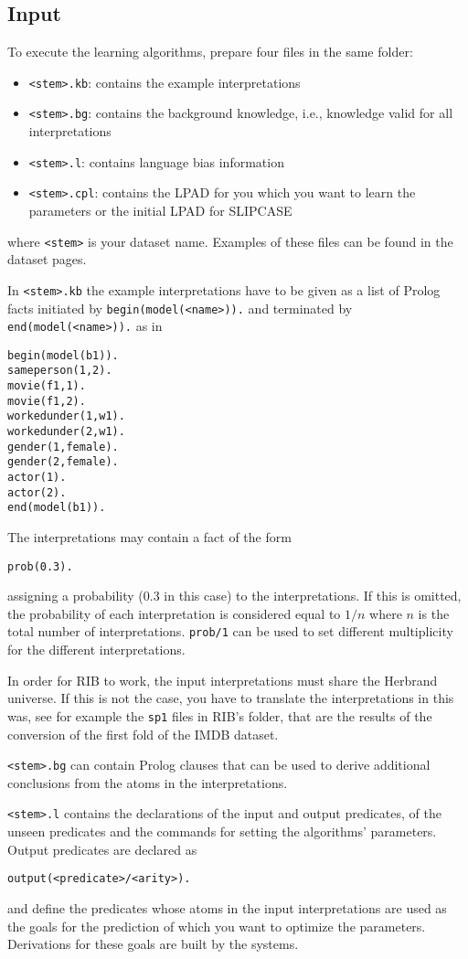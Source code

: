 \documentclass[a4paper,10pt]{article}
\begin{document}
\subsection{Input}
To execute the learning algorithms, prepare four files in the same folder: 
\begin{itemize}
\item \texttt{<stem>.kb}: contains the example interpretations 
\item \texttt{<stem>.bg}: contains the background knowledge, i.e., knowledge valid for all interpretations
\item \texttt{<stem>.l}: contains language bias information
\item \texttt{<stem>.cpl}: contains the LPAD for you which you want to learn the parameters or the initial LPAD for SLIPCASE
\end{itemize}
where \texttt{<stem>} is your dataset name. Examples of these files can be found in the dataset pages.

In \texttt{<stem>.kb} the example interpretations have to be given as a list of Prolog facts initiated by 
\texttt{begin(model(<name>)).} and terminated by \texttt{end(model(<name>)).} as in
\begin{verbatim}
begin(model(b1)).
sameperson(1,2).
movie(f1,1).
movie(f1,2).
workedunder(1,w1).
workedunder(2,w1).
gender(1,female).
gender(2,female).
actor(1).
actor(2).
end(model(b1)).
\end{verbatim}
The interpretations may contain a fact of the form
\begin{verbatim}
prob(0.3).
\end{verbatim}
assigning a probability (0.3 in this case) to the interpretations. If this is omitted, the probability of each interpretation is considered equal to $1/n$ where $n$ is the total number of interpretations. \verb|prob/1| can be used to set different multiplicity for the different interpretations.

In order for RIB to work, the input interpretations must share the Herbrand universe. If this is not the case, you have to translate the interpretations in this was, see for example the \texttt{sp1} files in RIB's folder, that are the results of the conversion of the first fold of the IMDB dataset.

\texttt{<stem>.bg} can contain Prolog clauses that can be used to derive additional conclusions from the atoms in 
the interpretations.

\texttt{<stem>.l} contains the declarations of the input and output predicates, of the unseen predicates and the commands for setting the algorithms' parameters.
Output predicates are declared as
\begin{verbatim}
output(<predicate>/<arity>).
\end{verbatim}
and define the predicates whose atoms in the input interpretations are used as the goals for the prediction of which you want to optimize the parameters. Derivations for these goals are built by the systems.
\end{document}
